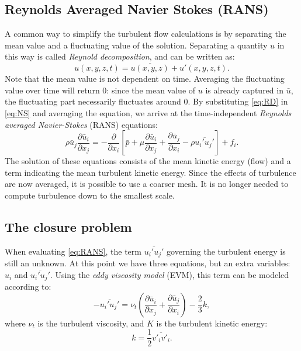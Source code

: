 \subsection{Reynolds Averaged Navier Stokes (RANS)}
A common way to simplify the turbulent flow calculations is by separating the mean value and a fluctuating value of the solution. Separating a quantity $u$ in this way is called \emph{Reynold decomposition}, and can be written as:
\begin{equation}\label{eq:RD}
u(x,y,z,t) = \overline{u(x,y,z)}+u'(x,y,z,t).
\end{equation}
Note that the mean value is not dependent on time. Averaging the fluctuating value over time will return 0: since the mean value of $u$ is already captured in $\bar{u}$, the fluctuating part necessarily fluctuates around 0. By substituting \autoref{eq:RD} in \autoref{eq:NS} and averaging the equation, we arrive at the time-independent \emph{Reynolds averaged Navier-Stokes} (RANS) equations:
\begin{equation}\label{eq:RANS}
\rho \bar{u}_j \frac{\partial \bar{u}_i}{\partial x_j} = -\frac{\partial}{\partial x_i} \left[ \bar{p} + \mu \frac{\partial \bar{u}_i}{\partial x_j} + \frac{\partial \bar{u}_j}{\partial x_i} - \rho \overline{u_i'u_j'}\right] + f_i. 
\end{equation} 
The solution of these equations consists of the mean kinetic energy (flow) and a term indicating the mean turbulent kinetic energy. Since the effects of turbulence are now averaged, it is possible to use a coarser mesh. It is no longer needed to compute turbulence down to the smallest scale. 

\subsection{The closure problem}
When evaluating \autoref{eq:RANS}, the term $\overline{u_i'u_j'}$ governing the turbulent energy is still an unknown. At this point we have three equations, but an extra variables: $u_i$ and $\overline{u_i'u_j'}$. Using the \emph{eddy viscosity model} (EVM), this term can be modeled according to:
\begin{equation}\label{eq:EVM}
-\overline{u_i'u_j'}=\nu_t\left(\frac{\partial \bar{u}_i}{\partial x_j} + \frac{\partial \bar{u}_j}{\partial x_i} \right) - \frac{2}{3}k,
\end{equation}
where $\nu_t$ is the turbulent viscosity, and $K$ is the turbulent kinetic energy:
\begin{equation}\label{eq:k}
k = \frac{1}{2}\overline{v'_iv'_i}.
\end{equation}

